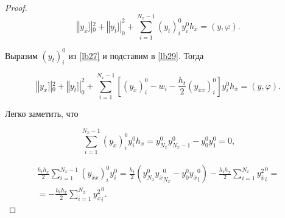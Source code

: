 \begin{proof}
\begin{equation}

\label{lb29}

\left\Vert y_{\overline{x}}\right.]|_{0}^{2}+\left\Vert y_{\overline{t}}\right.]|_{0}^{2}+\sum\limits_{i=1}^{N_x-1}(y_t)_{i}^{0} y_{i}^{0} h_x=(y,\varphi).

\end{equation}

Выразим $(y_t)_{i}^{0}$ из \eqref{lb27} и подставим в \eqref{lb29}. Тогда

\begin{equation}

\label{lb30}

\left\Vert y_{\overline{x}}\right.]|_{0}^{2}+\left\Vert y_{\overline{t}}\right.]|_{0}^{2}+\sum\limits_{i=1}^{N_x-1}\left[\left(y_{\mathring{x}}\right)_{i}^{0}-w_i-\frac{h_t}{2}

(y_{\overline{x}x})_{i}^{0}\right]y_{i}^{0} h_x=(y,\varphi).

\end{equation}

Легко заметить, что 

\begin{equation}

\label{lb31}

\sum\limits_{i=1}^{N_x-1}(y_{\mathring{x}})_{i}^{0} y_{i}^{0} h_x=y_{N_x}^{0}y_{N_x-1}^{0}-y_{0}^{0}y_{1}^{0}=0,

\end{equation}

\begin{multline}

\frac{h_t h_x}{2} \sum\limits_{i=1}^{N_x-1}(y_{\overline{x}x})_{i}^{0}y_{i}^{0}=

\frac{h_t}{2}(y_{N_x}^{0} \left.y_{\overline{x}}\right._{N_x}^{0}-y_{0}^{0}\left.y_{\overline{x}}\right._{1}^{0})-\frac{h_t h_x}{2} \sum\limits_{i=1}^{N_x}\left.y_{\overline{x}}^2\right._{i}^{0}=

\\

\label{lb32}

=- \frac{h_t h_x}{2} \sum\limits_{i=1}^{N_x}\left.y_{\overline{x}}^2\right._{i}^{0}.

\end{multline}





\end{proof}
